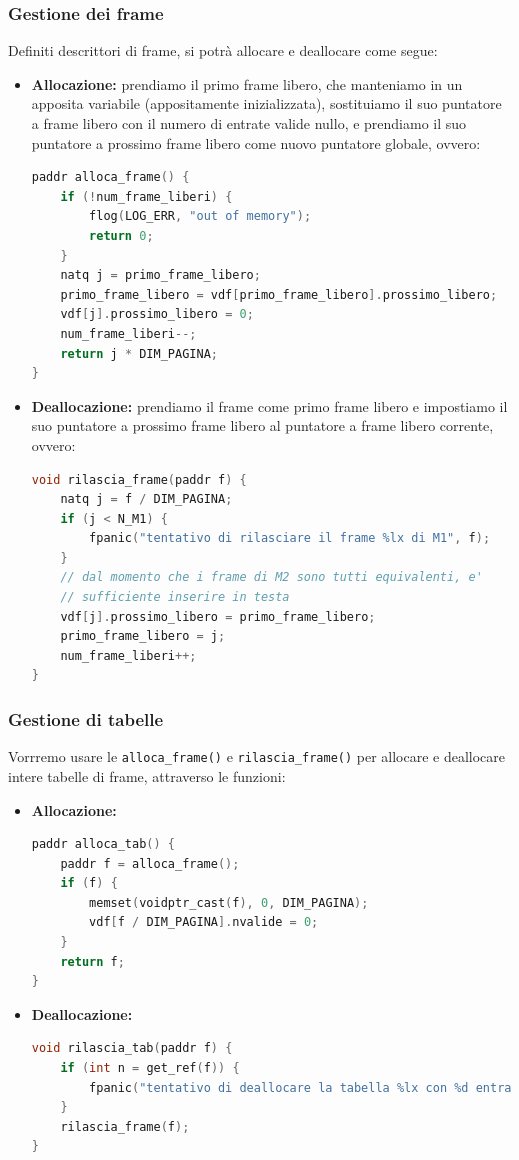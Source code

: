 \documentclass[a4paper,11pt]{article}
\begin{document}
\subsubsection{Gestione dei frame}
Definiti descrittori di frame, si potrà allocare e deallocare come segue:
\begin{itemize}
	\item \textbf{Allocazione:} prendiamo il primo frame libero, che manteniamo in un apposita variabile (appositamente inizializzata), sostituiamo il suo puntatore a frame libero con il numero di entrate valide nullo, e prendiamo il suo puntatore a prossimo frame libero come nuovo puntatore globale, ovvero:
\begin{lstlisting}[language=C++, style=codestyle]			
paddr alloca_frame() {
	if (!num_frame_liberi) {
		flog(LOG_ERR, "out of memory");
		return 0;
	}
	natq j = primo_frame_libero;
	primo_frame_libero = vdf[primo_frame_libero].prossimo_libero;
	vdf[j].prossimo_libero = 0;
	num_frame_liberi--;
	return j * DIM_PAGINA;
}
\end{lstlisting}

	\item \textbf{Deallocazione:} prendiamo il frame come primo frame libero e impostiamo il suo puntatore a prossimo frame libero al puntatore a frame libero corrente, ovvero:
\begin{lstlisting}[language=C++, style=codestyle]	
void rilascia_frame(paddr f) {
	natq j = f / DIM_PAGINA;
	if (j < N_M1) {
		fpanic("tentativo di rilasciare il frame %lx di M1", f);
	}
	// dal momento che i frame di M2 sono tutti equivalenti, e'
	// sufficiente inserire in testa
	vdf[j].prossimo_libero = primo_frame_libero;
	primo_frame_libero = j;
	num_frame_liberi++;
}
\end{lstlisting}
\end{itemize}

\subsubsection{Gestione di tabelle}
Vorrremo usare le \lstinline|alloca_frame()| e \lstinline|rilascia_frame()| per allocare e deallocare intere tabelle di frame, attraverso le funzioni:
\begin{itemize}
	\item \textbf{Allocazione:}
\begin{lstlisting}[language=C++, style=codestyle]	
paddr alloca_tab() {
	paddr f = alloca_frame();
	if (f) {
		memset(voidptr_cast(f), 0, DIM_PAGINA);
		vdf[f / DIM_PAGINA].nvalide = 0;
	}
	return f;
}
\end{lstlisting}

	\item \textbf{Deallocazione:}
\begin{lstlisting}[language=C++, style=codestyle]	
void rilascia_tab(paddr f) {
	if (int n = get_ref(f)) {
		fpanic("tentativo di deallocare la tabella %lx con %d entrate valide", f, n);
	}
	rilascia_frame(f);
}
\end{lstlisting}
\end{itemize}
\end{document}
